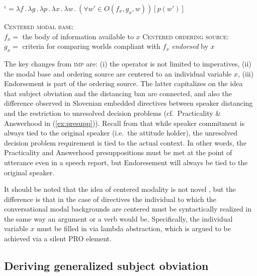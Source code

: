 \documentclass[output=paper,colorlinks,citecolor=brown]{langscibook}
\begin{document}
\ea\label{ex:dir} $^c=\lambda f \,.\, \lambda g \,.\, \lambda p \,.\, \lambda x\,.\, \lambda w \,.\, (\forall w'\in O(f_x,g_x,w))[p(w')]$
\z

\ea\label{ex:dir-fg} \ea \textsc{Centered modal base:}\\ {$f_x=$ the body of information available to $x$}
\ex \textsc{Centered ordering source:}\\ {$g_x=$ criteria for comparing worlds compliant with $f_x$ \emph{endorsed} by $x$}
\z\z    

\noindent The key changes from \textsc{imp} are: (i) the operator is not limited to imperatives, (ii) the modal base and ordering source are centered to an individual variable $x$, (iii) Endorsement is part of the ordering source. The latter capitalizes on the idea that subject obviation and the distancing ban are connected, and also the difference observed in Slovenian embedded directives between speaker distancing and the restriction to unresolved decision problems (cf.~Practicality \& Answerhood in (\ref{ex:presupp})). Recall from  that while speaker commitment is always tied to the original speaker (i.e.\ the attitude holder), the unresolved decision problem requirement is tied to the actual context. In other words, the Practicality and Answerhood presuppositions must be met at the point of utterance even in a speech report, but Endoresement will always be tied to the original speaker.

It should be noted that the idea of centered modality is not novel \citep[see among many others][]{hacquardDISS,hacquard10nals,stephenson07}, but the difference is that in the case of directives the individual to which the conversational modal backgrounds are centered must be syntactically realized in the same way an argument or a verb would be.
Specifically, the individual variable $x$ must be filled in via lambda abstraction, which is argued to be achieved via a silent PRO element.


\subsection{Deriving generalized subject obviation}
\label{subsec:deriving-obviation}
\end{document}
